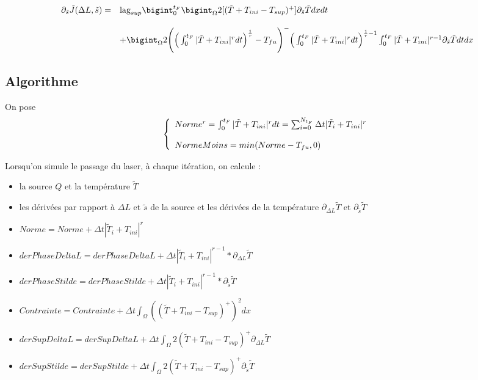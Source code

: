 \documentclass[11pt,a4paper]{article}
\begin{document}
\begin{equation}
\begin{array}{ll}
\partial_{\tilde{s}}\tilde{J}(\Delta L,\tilde{s})= & \textrm{lag}_{sup} \bigint_{0}^{t_F}\bigint_{\Omega}2[(\tilde{T}+T_{ini}-T_{sup})^+]\partial_{\tilde{s}}\tilde{T} dxdt\\
\\
\,&+\bigint_{\Omega}2\Bigg(\Big(\int_{0}^{t_F}|\tilde{T}+T_{ini}|^rdt\Big)^{\frac{1}{r}}-T_{fu}\Bigg)^-\Big(\int_{0}^{t_F}|\tilde{T}+T_{ini}|^rdt\Big)^{\frac{1}{r}-1}\int_{0}^{t_F}|\tilde{T}+T_{ini}|^{r-1}\partial_{\tilde{s}}\tilde{T} dtdx \\
\end{array}
\end{equation}

\subsection*{Algorithme}
On pose 
\begin{equation}
\left\{\begin{array}{l}
	Norme^r=\int_{0}^{t_F}|\tilde{T}+T_{ini}|^rdt=\sum_{i=0}^{N_{t_F}}\Delta t |\tilde{T}_i+T_{ini}|^r \\
	\\
	NormeMoins=min(Norme-T_{fu},0) \\	
	\end{array}\right.
\end{equation}

Lorsqu'on simule le passage du laser, à chaque itération, on calcule :
\begin{itemize}
	\item la source $Q$ et la température $\tilde{T}$
	\item les dérivées par rapport à $\Delta L$ et $\tilde{s}$ de la source et les dérivées de la température $\partial_{\Delta L}\tilde{T}$ et $\partial_{\tilde{s}}\tilde{T}$
	\item $Norme=Norme+\Delta t |\tilde{T}_i+T_{ini}|^r$
		\item $derPhaseDeltaL=derPhaseDeltaL+\Delta t |\tilde{T}_i+T_{ini}|^{r-1}*\partial_{\Delta L}\tilde{T}$
		\item $derPhaseStilde=derPhaseStilde+\Delta t |\tilde{T}_i+T_{ini}|^{r-1}*\partial_{\tilde{s}}\tilde{T}$	
		\item $Contrainte=Contrainte+\Delta t \int_{\Omega}\left(\left(\tilde{T}+T_{ini}-T_{sup}\right)^+\right)^2dx$
		\item $derSupDeltaL=derSupDeltaL+\Delta t \int_{\Omega}2\left(\tilde{T}+T_{ini}-T_{sup}\right)^+\partial_{\Delta L}\tilde{T}$
		\item $derSupStilde=derSupStilde+\Delta t \int_{\Omega}2\left(\tilde{T}+T_{ini}-T_{sup}\right)^+\partial_{\tilde{s}}\tilde{T}$
\end{itemize}
\end{document}
